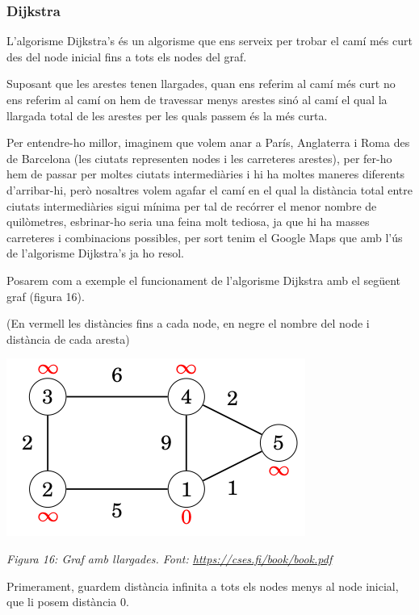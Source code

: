 \subsubsection{Dijkstra}

L'algorisme Dijkstra's és un algorisme que ens serveix per trobar el camí més curt des del node inicial fins a tots els nodes del graf. \newline

Suposant que les arestes tenen llargades, quan ens referim al camí més curt no ens referim al camí on hem de travessar menys arestes sinó al camí el qual la llargada total de les arestes per les quals passem és la més curta. \newline

Per entendre-ho millor, imaginem que volem anar a París, Anglaterra i Roma des de Barcelona (les ciutats representen nodes i les carreteres arestes), per fer-ho hem de passar per moltes ciutats intermediàries i hi ha moltes maneres diferents d'arribar-hi, però nosaltres volem agafar el camí en el qual la distància total entre ciutats intermediàries sigui mínima per tal de recórrer el menor nombre de quilòmetres, esbrinar-ho seria una feina molt tediosa, ja que hi ha masses carreteres i combinacions possibles, per sort tenim el Google Maps que amb l'ús de l'algorisme Dijkstra's ja ho resol. \newline

Posarem com a exemple el funcionament de l'algorisme Dijkstra amb el següent graf (figura 16).

(En vermell les distàncies fins a cada node, en negre el nombre del node i distància de cada aresta)
\newline

\begin{center}
    \includegraphics[width=.5 \textwidth]{grafDij1.png}
    
    \caption{\emph{Figura 16: Graf amb llargades. Font: \url{https://cses.fi/book/book.pdf}}}
\end{center}

Primerament, guardem distància infinita a tots els nodes menys al node inicial, que li posem distància 0.

